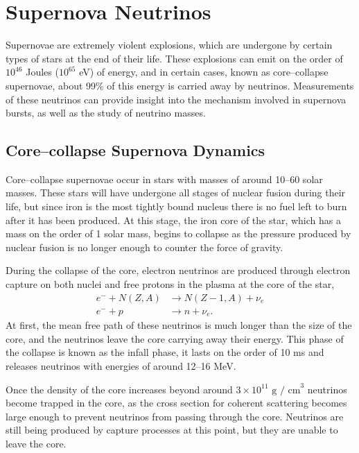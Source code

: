 \section{Supernova Neutrinos} \label{nu_sn}

Supernovae are extremely violent explosions, which are undergone by certain 
types of stars at the end of their life. These explosions can emit on the 
order of $10^{46}$ Joules ($10^{65}$ eV) of energy, and in certain cases, 
known as core--collapse supernovae, about 99\% of this energy is carried away by
neutrinos. Measurements of these neutrinos can provide insight into the 
mechanism involved in supernova bursts, as well as the study of neutrino 
masses\cite{GiuntiCarlo2007FoNP}.

\subsection{Core--collapse Supernova Dynamics}

Core--collapse supernovae occur in stars with masses of around 10--60 solar 
masses. These stars will have undergone all stages of nuclear fusion during
their life, but since iron is the most tightly bound nucleus there is no fuel 
left to burn after it has been produced. At this stage, the iron core of the
star, which has a mass on the order of 1 solar mass, begins to collapse as the
pressure produced by nuclear fusion is no longer enough to counter the force of
gravity. 

During the collapse of the core, electron neutrinos are produced through
electron capture on both nuclei and free protons in the plasma at the core of
the star,
\begin{align*}
	e^- + N(Z, A) &\rightarrow N(Z - 1, A) + \nu_e \\
	e^- + p &\rightarrow n + \nu_e.
\end{align*}
At first, the mean free path of these neutrinos is much longer than the size of
the core, and the neutrinos leave the core carrying away their energy. This phase
of the collapse is known as the infall phase, it lasts on the order of 10 ms
and releases neutrinos with energies of around 12--16 MeV.

Once the density of the core increases beyond around $3\times10^{11} 
\mbox{ g / cm}^3$ neutrinos become trapped in the core, as the cross section for
coherent scattering becomes large enough to prevent neutrinos from passing 
through the core. Neutrinos are still being produced by capture processes at 
this point, but they are unable to leave the core.

